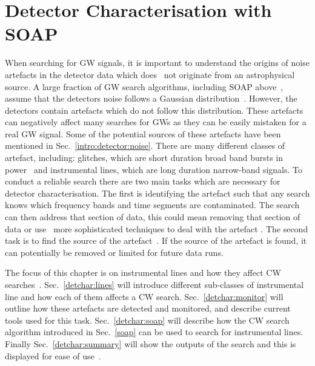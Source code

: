\chapter{\label{detchar}Detector Characterisation with SOAP}

When searching for \gls{GW} signals, it is important to understand the origins
of noise artefacts in the detector data which does~ not originate from an
astrophysical source.  A large fraction of \gls{GW} search algorithms,
including SOAP above~, assume that the detectors noise follows a Gaussian
distribution~.  However, the detectors contain artefacts which do not follow
this distribution.  These artefacts can negatively affect many searches for
\glspl{GW} as they can be easily mistaken for a real \gls{GW} signal.  Some of
the potential sources of these artefacts have been mentioned in
Sec.~\ref{intro:detector:noise}.  There are many different classes of artefact,
including: glitches, which are short duration broad band bursts in
power~ and
instrumental lines, which are long duration narrow-band signals.  To conduct a
reliable search there are two main tasks which are necessary for detector
characterisation.  The first is identifying the artefact such that any search
knows which frequency bands and time segments are contaminated.  The search can
then address that section of data, this could mean removing that section of
data or use~ more sophisticated techniques to deal with the artefact
\citep{pankow2018MitigationInstrumental}.  The second task is to find the
source of the artefact~.  If the source of the artefact is found, it can
potentially be removed or limited for future data runs.

The focus of this chapter is on instrumental lines and how they affect \gls{CW}
searches~.
Sec.~\ref{detchar:lines} will introduce different sub-classes of instrumental line and how each of them affects a \gls{CW} search.
Sec.~\ref{detchar:monitor} will outline how these artefacts are detected and monitored, and describe current tools used for this task.
Sec.~\ref{detchar:soap} will describe how the \gls{CW} search algorithm
introduced in Sec.~\ref{soap} can be used to search for instrumental lines.
Finally Sec.~\ref{detchar:summary} will show the outputs of the search and this
is displayed for ease of use~.



